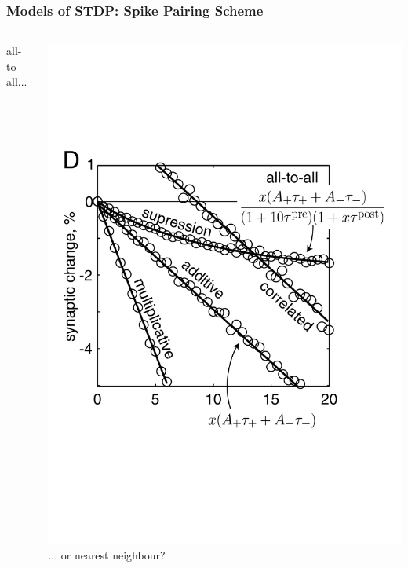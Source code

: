 \documentclass{beamer}
\begin{document}
\begin{frame}
\frametitle{Models of STDP: Spike Pairing Scheme}
\begin{columns}[T]
    all-to-all...

    \includegraphics[width=\textwidth]{./figures/izhik_a2a}
    ... or nearest neighbour?


\end{columns}
\end{frame}
\end{document}
